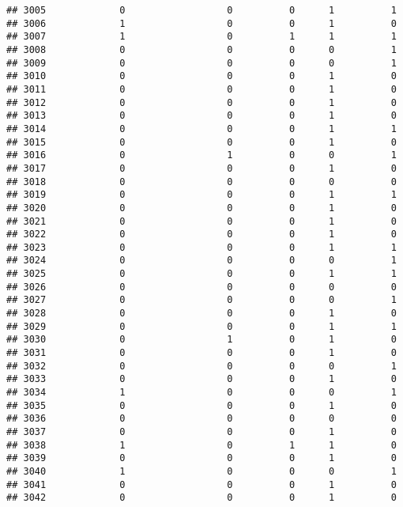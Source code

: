 \documentclass[
]{article}
\begin{document}
\begin{verbatim}
## 3005             0                  0          0      1          1
## 3006             1                  0          0      1          0
## 3007             1                  0          1      1          1
## 3008             0                  0          0      0          1
## 3009             0                  0          0      0          1
## 3010             0                  0          0      1          0
## 3011             0                  0          0      1          0
## 3012             0                  0          0      1          0
## 3013             0                  0          0      1          0
## 3014             0                  0          0      1          1
## 3015             0                  0          0      1          0
## 3016             0                  1          0      0          1
## 3017             0                  0          0      1          0
## 3018             0                  0          0      0          0
## 3019             0                  0          0      1          1
## 3020             0                  0          0      1          0
## 3021             0                  0          0      1          0
## 3022             0                  0          0      1          0
## 3023             0                  0          0      1          1
## 3024             0                  0          0      0          1
## 3025             0                  0          0      1          1
## 3026             0                  0          0      0          0
## 3027             0                  0          0      0          1
## 3028             0                  0          0      1          0
## 3029             0                  0          0      1          1
## 3030             0                  1          0      1          0
## 3031             0                  0          0      1          0
## 3032             0                  0          0      0          1
## 3033             0                  0          0      1          0
## 3034             1                  0          0      0          1
## 3035             0                  0          0      1          0
## 3036             0                  0          0      0          0
## 3037             0                  0          0      1          0
## 3038             1                  0          1      1          0
## 3039             0                  0          0      1          0
## 3040             1                  0          0      0          1
## 3041             0                  0          0      1          0
## 3042             0                  0          0      1          0

\end{verbatim}
\end{document}
